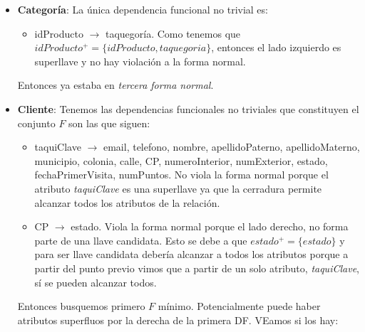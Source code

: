 \documentclass[11pt,letterpaper]{article}
\begin{document}
\begin{itemize}
\item \textbf{Categoría}: La única dependencia funcional no trivial es:

\begin{itemize}
\item idProducto $\rightarrow$ taquegoría. Como tenemos que $idProducto^+=\{idProducto,taquegoria\}$, entonces el lado izquierdo es superllave y no hay violación a la forma normal.
\end{itemize}

Entonces ya estaba en \textit{tercera forma normal}.


\item \textbf{Cliente}: Tenemos las dependencias funcionales no triviales que constituyen el conjunto $F$ son las que siguen:

\begin{itemize}
\item taquiClave $\rightarrow$ email, telefono, nombre, apellidoPaterno, apellidoMaterno,  municipio, colonia, calle, CP, numeroInterior, numExterior, estado, fechaPrimerVisita, numPuntos. No viola la forma normal porque el atributo \textit{taquiClave} es una superllave ya que la cerradura permite alcanzar todos los atributos de la relación. 
\item CP $\rightarrow$ estado. Viola la forma normal porque el lado derecho, no forma parte de una llave candidata. Esto se debe a que $estado^+ =\{estado\}$ y para ser llave candidata debería alcanzar a todos los atributos porque a partir del punto previo vimos que a partir de un solo atributo, \textit{taquiClave}, sí se pueden alcanzar todos.
\end{itemize}



Entonces busquemos primero $F$ mínimo. Potencialmente puede haber atributos superfluos por la derecha de la primera DF. VEamos si los hay:


\end{itemize}
\end{document}
